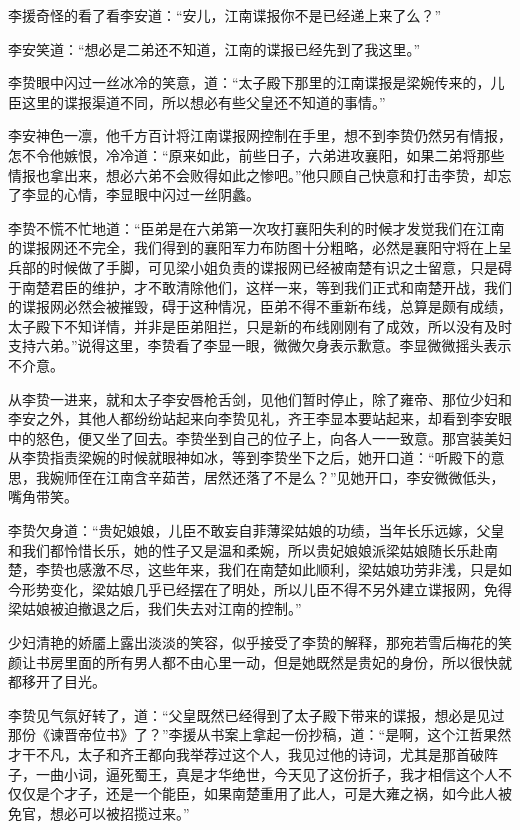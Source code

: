 李援奇怪的看了看李安道：“安儿，江南谍报你不是已经递上来了么？”

李安笑道：“想必是二弟还不知道，江南的谍报已经先到了我这里。”

李贽眼中闪过一丝冰冷的笑意，道：“太子殿下那里的江南谍报是梁婉传来的，儿臣这里的谍报渠道不同，所以想必有些父皇还不知道的事情。”

李安神色一凛，他千方百计将江南谍报网控制在手里，想不到李贽仍然另有情报，怎不令他嫉恨，冷冷道：“原来如此，前些日子，六弟进攻襄阳，如果二弟将那些情报也拿出来，想必六弟不会败得如此之惨吧。”他只顾自己快意和打击李贽，却忘了李显的心情，李显眼中闪过一丝阴蠡。

李贽不慌不忙地道：“臣弟是在六弟第一次攻打襄阳失利的时候才发觉我们在江南的谍报网还不完全，我们得到的襄阳军力布防图十分粗略，必然是襄阳守将在上呈兵部的时候做了手脚，可见梁小姐负责的谍报网已经被南楚有识之士留意，只是碍于南楚君臣的维护，才不敢清除他们，这样一来，等到我们正式和南楚开战，我们的谍报网必然会被摧毁，碍于这种情况，臣弟不得不重新布线，总算是颇有成绩，太子殿下不知详情，并非是臣弟阻拦，只是新的布线刚刚有了成效，所以没有及时支持六弟。”说得这里，李贽看了李显一眼，微微欠身表示歉意。李显微微摇头表示不介意。

从李贽一进来，就和太子李安唇枪舌剑，见他们暂时停止，除了雍帝、那位少妇和李安之外，其他人都纷纷站起来向李贽见礼，齐王李显本要站起来，却看到李安眼中的怒色，便又坐了回去。李贽坐到自己的位子上，向各人一一致意。那宫装美妇从李贽指责梁婉的时候就眼神如冰，等到李贽坐下之后，她开口道：“听殿下的意思，我婉师侄在江南含辛茹苦，居然还落了不是么？”见她开口，李安微微低头，嘴角带笑。

李贽欠身道：“贵妃娘娘，儿臣不敢妄自菲薄梁姑娘的功绩，当年长乐远嫁，父皇和我们都怜惜长乐，她的性子又是温和柔婉，所以贵妃娘娘派梁姑娘随长乐赴南楚，李贽也感激不尽，这些年来，我们在南楚如此顺利，梁姑娘功劳非浅，只是如今形势变化，梁姑娘几乎已经摆在了明处，所以儿臣不得不另外建立谍报网，免得梁姑娘被迫撤退之后，我们失去对江南的控制。”

少妇清艳的娇靥上露出淡淡的笑容，似乎接受了李贽的解释，那宛若雪后梅花的笑颜让书房里面的所有男人都不由心里一动，但是她既然是贵妃的身份，所以很快就都移开了目光。

李贽见气氛好转了，道：“父皇既然已经得到了太子殿下带来的谍报，想必是见过那份《谏晋帝位书》了？”李援从书案上拿起一份抄稿，道：“是啊，这个江哲果然才干不凡，太子和齐王都向我举荐过这个人，我见过他的诗词，尤其是那首破阵子，一曲小词，逼死蜀王，真是才华绝世，今天见了这份折子，我才相信这个人不仅仅是个才子，还是一个能臣，如果南楚重用了此人，可是大雍之祸，如今此人被免官，想必可以被招揽过来。”

